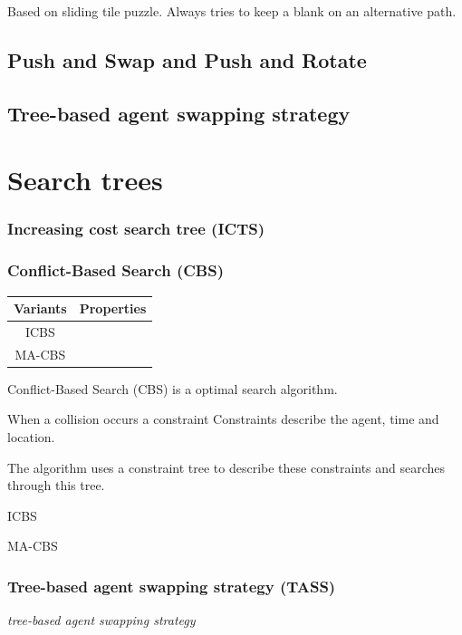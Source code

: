 \documentclass[a4paper,11pt]{article}
\begin{document}
Based on sliding tile puzzle. Always tries to keep a blank on an alternative path.

\subsection{Push and Swap and Push and Rotate}

\subsection{Tree-based agent swapping strategy}


\section{Search trees}
\subsubsection{Increasing cost search tree (ICTS)}


\subsubsection{Conflict-Based Search (CBS)}

\begin{table}
	\begin{tabular}{ c c }
		Variants & Properties \\
		\hline
		ICBS &   \\
		MA-CBS & \\
		
	\end{tabular}
\end{table}
	


Conflict-Based Search (CBS) is a optimal search algorithm.

When a collision occurs a constraint 
Constraints describe the agent, time and location.

The algorithm uses a constraint tree to describe these constraints and searches through this tree.

ICBS

MA-CBS

\subsubsection*{Tree-based agent swapping strategy (TASS)}
\textit{tree-based agent swapping strategy}
\end{document}
